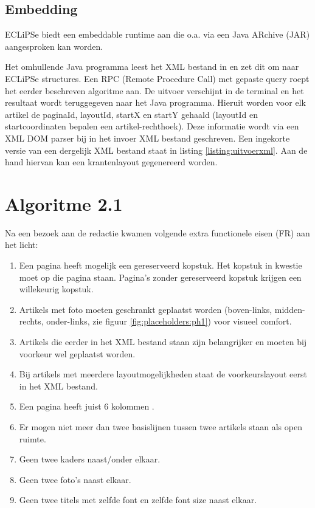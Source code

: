 \documentclass[a4paper,12pt]{report}
\begin{document}
	\subsection{Embedding}
ECLiPSe biedt een embeddable runtime aan die o.a. via een Java ARchive (JAR) aangesproken kan worden.

Het omhullende Java programma leest het XML bestand in en zet dit om naar \mbox{ECLiPSe} structures. Een RPC (Remote Procedure Call) met gepaste query roept het eerder beschreven algoritme aan. De uitvoer verschijnt in de terminal en het resultaat wordt teruggegeven naar het Java programma. Hieruit worden voor elk artikel de paginaId, layoutId, startX en startY gehaald (layoutId en startcoordinaten bepalen een artikel-rechthoek). Deze informatie wordt via een XML DOM parser bij in het invoer XML bestand geschreven. Een ingekorte versie van een dergelijk XML bestand staat in listing \ref{listing:uitvoerxml}. Aan de hand hiervan kan een krantenlayout gegenereerd worden.

	\section{Algoritme 2.1}
Na een bezoek aan de redactie kwamen volgende extra functionele eisen (FR) aan het licht:

\begin{enumerate}
	\item Een pagina heeft mogelijk een gereserveerd kopstuk. Het kopstuk in kwestie moet op die pagina staan. Pagina's zonder gereserveerd kopstuk krijgen een willekeurig kopstuk. \label{gereserveerdkopstuk}
	
	\item Artikels met foto moeten geschrankt geplaatst worden (boven-links, midden-rechts, onder-links, zie figuur \ref{fig:placeholders:ph1}) voor visueel comfort. \label{geschrankteartikels}
	
	\item Artikels die eerder in het XML bestand staan zijn belangrijker en moeten bij voorkeur wel geplaatst worden. \label{arteerderxmlbelangrijker}
	
	\item Bij artikels met meerdere layoutmogelijkheden staat de voorkeurslayout eerst in het XML bestand. \label{layouteerderxmlbelangrijker}
	
	\item Een pagina heeft juist 6 kolommen \label{zeskolommen}.
	
	\item Er mogen niet meer dan twee basislijnen tussen twee artikels staan als open ruimte. \label{tweebasislijnen}
	
	\item Geen twee kaders naast/onder elkaar.
	\item Geen twee foto's naast elkaar.
	\item Geen twee titels met zelfde font en zelfde font size naast elkaar.
\end{enumerate}
\end{document}

